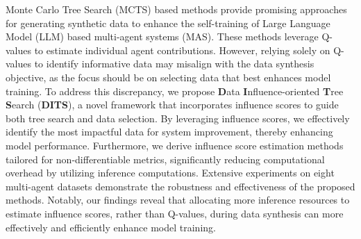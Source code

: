 Monte Carlo Tree Search (MCTS) based methods provide promising approaches for generating synthetic data to enhance the self-training of Large Language Model (LLM) based multi-agent systems (MAS). These methods leverage Q-values to estimate individual agent contributions. However, relying solely on Q-values to identify informative data may misalign with the data synthesis objective, as the focus should be on selecting data that best enhances model training. To address this discrepancy, we propose \textbf{D}ata \textbf{I}nfluence-oriented \textbf{T}ree \textbf{S}earch (\textbf{DITS}), a novel framework that incorporates influence scores to guide both tree search and data selection. By leveraging influence scores, we effectively identify the most impactful data for system improvement, thereby enhancing model performance. Furthermore, we derive influence score estimation methods tailored for non-differentiable metrics, significantly reducing computational overhead by utilizing inference computations. Extensive experiments on eight multi-agent datasets demonstrate the robustness and effectiveness of the proposed methods. Notably, our findings reveal that allocating more inference resources to estimate influence scores, rather than Q-values, during data synthesis can more effectively and efficiently enhance model training.
